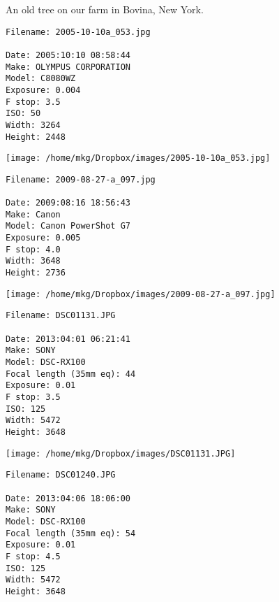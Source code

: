\noindent An old tree on our farm in Bovina, New York.
\begin{lstlisting}
Filename: 2005-10-10a_053.jpg

Date: 2005:10:10 08:58:44
Make: OLYMPUS CORPORATION
Model: C8080WZ
Exposure: 0.004
F stop: 3.5
ISO: 50
Width: 3264
Height: 2448
\end{lstlisting}

\begin{landscape}

\texttt{[image: /home/mkg/Dropbox/images/2005-10-10a\_053.jpg]}
\end{landscape}



\noindent 
\begin{lstlisting}
Filename: 2009-08-27-a_097.jpg

Date: 2009:08:16 18:56:43
Make: Canon
Model: Canon PowerShot G7
Exposure: 0.005
F stop: 4.0
Width: 3648
Height: 2736
\end{lstlisting}

\begin{landscape}

\texttt{[image: /home/mkg/Dropbox/images/2009-08-27-a\_097.jpg]}
\end{landscape}



\noindent 
\begin{lstlisting}
Filename: DSC01131.JPG

Date: 2013:04:01 06:21:41
Make: SONY
Model: DSC-RX100
Focal length (35mm eq): 44
Exposure: 0.01
F stop: 3.5
ISO: 125
Width: 5472
Height: 3648
\end{lstlisting}

\begin{landscape}

\texttt{[image: /home/mkg/Dropbox/images/DSC01131.JPG]}
\end{landscape}



\noindent 
\begin{lstlisting}
Filename: DSC01240.JPG

Date: 2013:04:06 18:06:00
Make: SONY
Model: DSC-RX100
Focal length (35mm eq): 54
Exposure: 0.01
F stop: 4.5
ISO: 125
Width: 5472
Height: 3648
\end{lstlisting}


